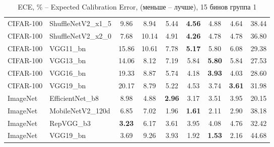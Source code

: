 \begin{table}[h!]
{\begin{tabular}{llccccccc}
CIFAR-100 & ShuffleNetV2\_x1\_5 &                  9.86 &                  8.94 &                  5.44 & \textbf{4.56} &                  4.88 &                  4.64 &       38.44 \\
CIFAR-100 & ShuffleNetV2\_x2\_0 &                  7.68 &                 10.14 &                  4.91 & \textbf{4.26} &                  4.78 &                  4.78 &       36.80 \\
CIFAR-100 &          VGG11\_bn &                 15.86 &                 10.61 &                  7.78 & \textbf{5.17} &                  5.80 &                  6.08 &       29.38 \\
CIFAR-100 &          VGG13\_bn &                 14.06 &                  8.12 &                  7.19 &                  5.84 & \textbf{5.80} &                  5.84 &       27.53 \\
CIFAR-100 &          VGG16\_bn &                 19.33 &                  8.87 &                  5.74 &                  4.18 & \textbf{3.93} &                  4.03 &       28.60 \\
CIFAR-100 &          VGG19\_bn &                 20.17 &                  8.79 &                  5.22 &                  4.53 &                  3.74 & \textbf{3.61} &       31.98 \\
 ImageNet &   EfficientNet\_b8 &                  8.98 &                  4.88 & \textbf{2.96} &                  3.17 &                  3.51 &                  3.95 &       20.15 \\
 ImageNet &  MobileNetV2\_120d &                  6.85 &                  7.02 &                  1.96 & \textbf{1.61} &                  2.11 &                  2.90 &       38.18 \\
 ImageNet &         RepVGG\_b3 & \textbf{3.23} &                  6.17 &                  3.61 &                  3.95 &                  4.08 &                  4.76 &       32.42 \\
 ImageNet &          VGG19\_bn &                  3.69 &                  9.26 &                  3.93 &                  1.92 & \textbf{1.53} &                  2.16 &       44.68 \\
\bottomrule
\end{tabular}%
}
\caption{ECE, \% -- Expected Calibration Error, (меньше -- лучше), 15 бинов группа 1}
\label{tab:metrics:ECE_1}
\end{table}
